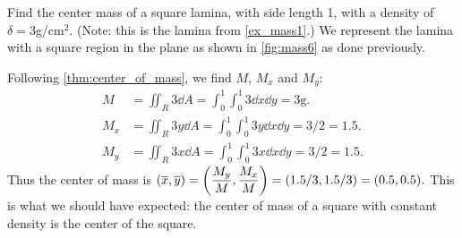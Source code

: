\begin{example}\label{ex_mass6}%
Find the center mass of a square lamina, with side length 1, with a density of $\delta = 3$g/cm$^2$. (Note: this is the lamina from \autoref{ex_mass1}.)
\solution
We represent the lamina with a square region in the plane as shown in \autoref{fig:mass6} as done previously. 

Following \autoref{thm:center_of_mass}, we find $M$, $M_x$ and $M_y$:
%
%
\begin{align*}
M &= \iint_R 3\dd A = \int_0^1\int_0^1 3\dd x\dd y =3\text{g}.\\
M_x &= \iint_R 3y\dd A = \int_0^1\int_0^1 3y\dd x\dd y =3/2 = 1.5.\\
M_y &= \iint_R 3x\dd A = \int_0^1\int_0^1 3x\dd x\dd y =3/2 = 1.5.
\end{align*}
Thus the center of mass is $\displaystyle (\overline{x},\overline{y}) = \left(\frac{M_y}M,\frac{M_x}M\right) = (1.5/3,1.5/3) = (0.5,0.5).$ This is what we should have expected: the center of mass of a square with constant density is the center of the square.
\end{example}

